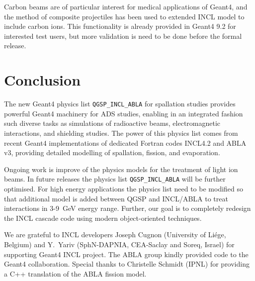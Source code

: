 \documentclass[a4paper]{jpconf}
\begin{document}
Carbon beams are of particular interest for medical applications of Geant4, 
and the method of composite projectiles has been used to extended INCL model to include carbon ions.
This functionality is already provided in Geant4 9.2 for interested test users, 
but more validation is need to be done before the formal release.

\section{Conclusion}\label{sec:conclusion}
The new Geant4 physics list {\tt QGSP\_\-INCL\_ABLA} for spallation studies 
provides powerful Geant4 machinery for ADS studies, enabling in an integrated fashion 
such diverse tasks as simulations of radioactive beams, 
electromagnetic interactions, and shielding studies. 
The power of this physics list comes from recent Geant4 implementations of 
dedicated  Fortran codes INCL4.2 and ABLA v3, providing detailed modelling
of spallation, fission, and evaporation.


Ongoing work is improve of the physics models for the treatment of light ion beams.
In future releases the physics list {\tt QGSP\_\-INCL\_ABLA} will be further optimised. 
For high energy applications the physics list need to be modified
so that additional model is added between QGSP and INCL/ABLA to treat interactions in 3-9~GeV energy range.
Further, our goal is to completely redesign the INCL cascade code using modern object-oriented techniques.


\ack %
We are grateful to INCL developers Joseph Cugnon (University of Li\'{e}ge, Belgium) and 
Y.~Yariv (SphN-DAPNIA, CEA-Saclay and Soreq, Israel) for supporting Geant4 INCL project.
The ABLA group kindly provided code to the Geant4 collaboration. 
Special thanks to Christelle Schmidt (IPNL) for providing a C++ translation of 
the ABLA fission model. 



\end{document}
